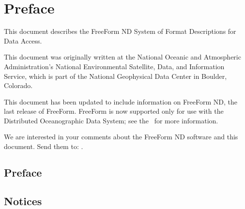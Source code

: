 %
%

\T\chapter*{Preface}
\T{}

This document describes the FreeForm ND System of Format Descriptions
for Data Access. 

This document was originally written at the National Oceanic
and Atmospheric Administration's National Environmental Satellite,
Data, and Information Service, which is part of the National
Geophysical Data Center in Boulder, Colorado.

This document has been updated to include information on FreeForm ND,
the last release of FreeForm. FreeForm is now supported only for use
with the Distributed Oceanographic Data System; see the 
\DODShome\ for more information.

We are interested in your comments about the FreeForm ND software and
this document.  Send them to:
.

\begin{ifhtml}
  \chapter*{Preface}
\end{ifhtml}

\W\section{Notices}





